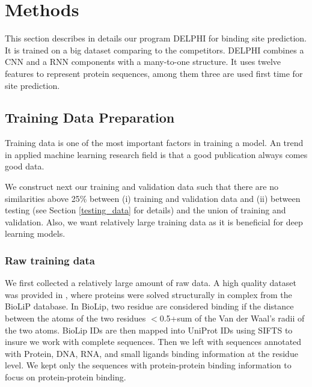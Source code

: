 \section{Methods}
This section describes in details our program DELPHI for binding site prediction. It is trained on a big dataset comparing to the competitors. DELPHI combines a CNN and a RNN components with a many-to-one structure. It uses twelve features to represent protein sequences, among them three are used first time for site prediction. 

\subsection{Training Data Preparation}
Training data is one of the most important factors in training a model. An trend in applied machine learning research field is that a good publication always comes good data. 

We construct next our training and validation data such that there are no similarities above 25\% between (i) training and validation data and (ii) between testing (see Section \ref{testing_data} for details) and the union of training and validation. Also, we want relatively large training data as it is beneficial for deep learning models.
    
\subsubsection{Raw training data}
We first collected a relatively large amount of raw data. A high quality dataset was provided in \cite{zhang2019comprehensive}, where proteins were solved structurally in complex from the BioLiP \cite{yang2012biolip} database. In BioLip, two residue are considered binding if the distance between the atoms of the 
two residues $<$0.5+sum of the Van der Waal's radii of the two atoms. BioLip IDs are then mapped into UniProt IDs using SIFTS \cite{velankar2012sifts} to insure we work with complete sequences. Then we left with sequences annotated with Protein, DNA, RNA, and small ligands binding information at the residue level. We kept only the sequences with protein-protein binding information to focus on protein-protein binding.
